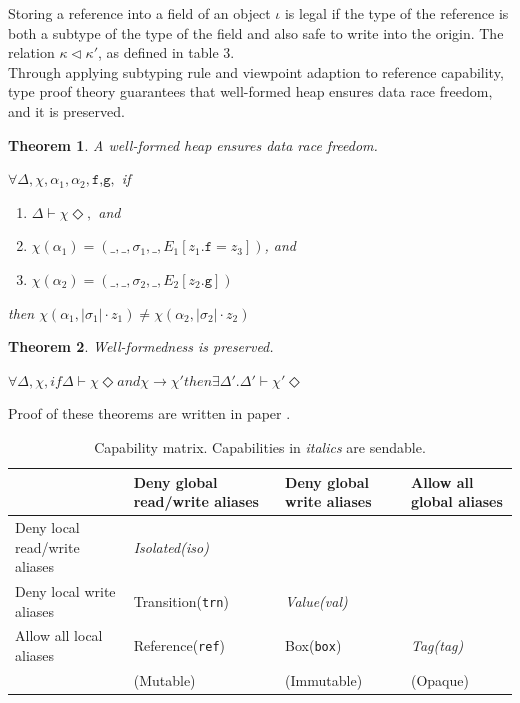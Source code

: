 \documentclass{article}
\begin{document}
\begin{multicols}{2}
Storing a reference into a field of an object $\iota$ is legal if the type of the reference is both a subtype of the type of the field and also safe to write into the origin. The relation $\kappa \triangleleft \kappa'$, as defined in table 3. \\


Through applying subtyping rule and viewpoint adaption to reference capability, type proof theory guarantees that well-formed heap ensures data race freedom, and it is preserved.

\newtheorem{theorem}{Theorem}
\begin{theorem}
	A well-formed heap ensures data race freedom.
	
	$\forall \Delta,\chi,\alpha_1,\alpha_2,\texttt{f,g},$ if
	
	\begin{enumerate}
		\item $\Delta \vdash \chi \Diamond,$ and
		\item $\chi(\alpha_1) = (\_,\_,\sigma_1, \_,  E_1[z_1.\texttt{f} = z_3])$, and
		\item $\chi(\alpha_2) = (\_,\_,\sigma_2, \_,  E_2[z_2.\texttt{g}])$
	\end{enumerate} 
	
	then $\chi(\alpha_1, |\sigma_1|\cdot z_1) \neq \chi(\alpha_2, |\sigma_2| \cdot z_2)$
\end{theorem}

\begin{theorem} 
	Well-formedness is preserved.
	
	$\forall \Delta, \chi, if \Delta \vdash \chi \Diamond and \chi \rightarrow \chi' then  \exists \Delta'.\Delta' \vdash \chi'\Diamond$
\end{theorem}

Proof of these theorems are written in paper \cite{type-proof-paper}.


\begin{table}[]
\begin{tabularx}{\textwidth}{|X|X|X|X|}
 \hline
 & Deny global read/write aliases & Deny global write aliases & Allow all global aliases \\  \hline
Deny local read/write aliases & \textit{Isolated(iso) }    &                           &                        \\  \hline
Deny local write aliases      & Transition(\texttt{trn})                & \textit{Value(val)  }              &                        \\  \hline
Allow all local aliases       & Reference(\texttt{ref})                 & Box(\texttt{box})                  & \textit{Tag(tag)  }             \\  \hline
                              & (Mutable)                      & (Immutable)               & (Opaque)   \\ \hline           
\end{tabularx}
\caption{Capability matrix. Capabilities in \textit{italics} are sendable.\cite{type-proof-paper} }
\end{table}


\end{multicols}
\end{document}
